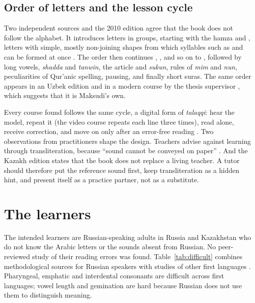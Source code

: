 \documentclass[a4paper,14pt]{extarticle}
\begin{document}
\subsection{Order of letters and the lesson cycle}

Two independent sources and the 2010 edition agree that the book does not follow the alphabet. It
introduces letters in groups, starting with the hamza and , letters with simple, mostly
non-joining shapes from which syllables such as  and  can be formed at once
\cite{SRC-021,SRC-040}. The order then continues
, ,  and so on to , followed by long vowels, \emph{shadda} and
\emph{tanwin}, the article and \emph{sukun}, rules of \emph{mim} and \emph{nun}, peculiarities of Qur'anic
spelling, pausing, and finally short suras. The same order appears in an Uzbek edition and in a modern
course by the thesis supervisor \cite{SRC-070}, which suggests that it is Maksudi's own.

Every course found follows the same cycle, a digital form of \emph{talaqqi}: hear the model, repeat it
(the video course repeats each line three times), read alone, receive correction, and move on only after
an error-free reading \cite{SRC-021,SRC-022,SRC-058}. Two observations from practitioners shape the
design. Teachers advise against learning through transliteration, because ``sound cannot be conveyed on
paper'' \cite{SRC-021,SRC-022}. And the Kazakh edition states that the book does not replace a living
teacher. A tutor should therefore put the reference sound first, keep transliteration as a hidden hint,
and present itself as a practice partner, not as a substitute.

\section{The learners}

The intended learners are Russian-speaking adults in Russia and Kazakhstan who do not know the Arabic
letters or the sounds absent from Russian. No peer-reviewed study of their reading errors was found.
Table~\ref{tab:difficult} combines methodological sources for Russian speakers with studies of other
first languages \cite{SRC-023,SRC-034,SRC-035}. Pharyngeal, emphatic and interdental consonants are
difficult across first languages; vowel length and gemination are hard because Russian does not use
them to distinguish meaning.
\end{document}
